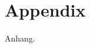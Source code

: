 \documentclass{Bericht}
\begin{document}




\newpage
\section{Appendix} %
	Anhang.
	
\vfill %

\printbibliography
\end{document}
